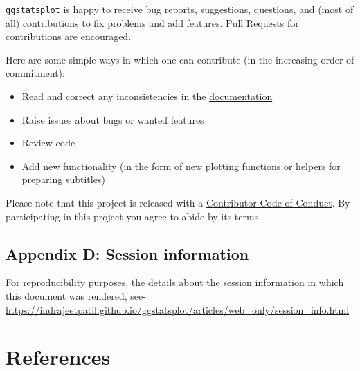 \documentclass[
]{article}
\begin{document}
\texttt{ggstatsplot} is happy to receive bug reports, suggestions, questions, and (most
of all) contributions to fix problems and add features. Pull Requests for
contributions are encouraged.

Here are some simple ways in which one can contribute (in the increasing order
of commitment):

\begin{itemize}
\item
  Read and correct any inconsistencies in the
  \href{https://indrajeetpatil.github.io/ggstatsplot/}{documentation}
\item
  Raise issues about bugs or wanted features
\item
  Review code
\item
  Add new functionality (in the form of new plotting functions or helpers for
  preparing subtitles)
\end{itemize}

Please note that this project is released with a
\href{https://github.com/IndrajeetPatil/ggstatsplot/blob/master/CODE_OF_CONDUCT.md}{Contributor Code of Conduct}. By participating in this project you agree to abide by its terms.

\hypertarget{appendix-d-session-information}{%
\subsection{Appendix D: Session information}\label{appendix-d-session-information}}

For reproducibility purposes, the details about the session information in which
this document was rendered, see-
\url{https://indrajeetpatil.github.io/ggstatsplot/articles/web_only/session_info.html}

\newpage

\hypertarget{references}{%
\section*{References}\label{references}}
\end{document}
